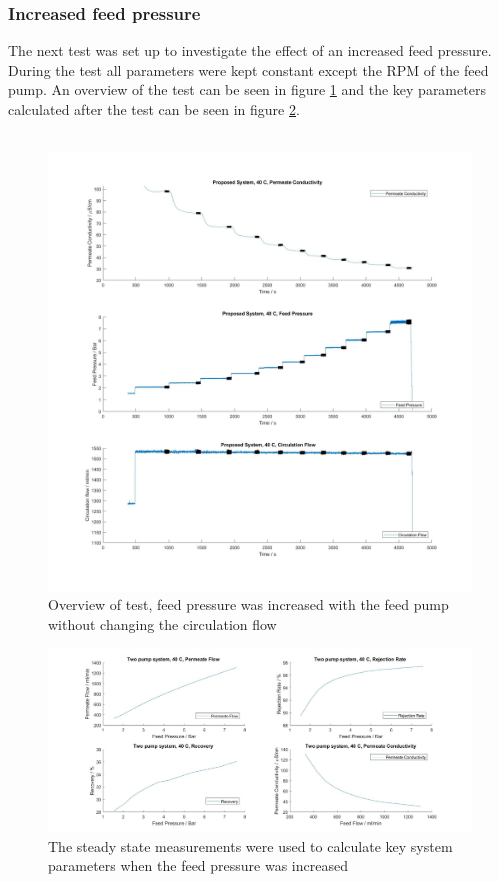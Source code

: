 \subsubsection{Increased feed pressure}
The next test was set up to investigate the effect of an increased feed pressure. During the test all parameters were kept constant except the RPM of the feed pump. An overview of the test can be seen in figure \ref{fig:FeedPumpIncrease40} and the key parameters calculated after the test can be seen in figure \ref{fig:FeedPumpIncrease40Key}.\\
\\
\begin{figure}[H]
    \centering
    \includegraphics[width=1.1\textwidth]{FeedPumpIncrease40}
    \caption{Overview of test, feed pressure was increased with the feed pump without changing the circulation flow}
    \label{fig:FeedPumpIncrease40}
\end{figure}

\begin{figure}[H]
    \centering
    \includegraphics[width=1.1\textwidth]{FeedPumpIncrease40Key}
    \caption{The steady state measurements were used to calculate key system parameters when the feed pressure was increased}
    \label{fig:FeedPumpIncrease40Key}
\end{figure}

